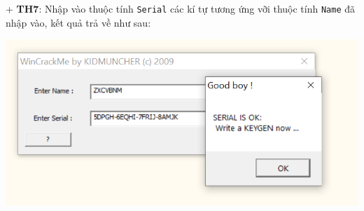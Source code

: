 + \textbf{TH7}: Nhập vào thuộc tính \texttt{Serial} các kí tự tương ứng vỡi thuộc tính \texttt{Name} đã nhập vào, kết quả trả về như sau:
\begin{center}
    \includegraphics[width=\textwidth]{img/file-2/demo8.PNG}
\end{center}



